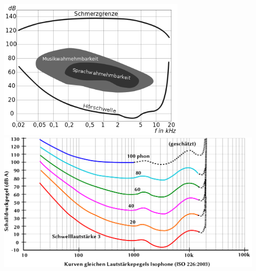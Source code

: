 \documentclass[german,color,6pt]{latex4ei/latex4ei_sheet}
\begin{document}
\begin{sectionbox}
\begin{center}
	\includegraphics[width=0.7\textwidth]{Hoerflaeche}
	\includegraphics[width=\textwidth]{kurve_gleicher_lautstaerke}
\end{center}


\end{sectionbox}
\end{document}
